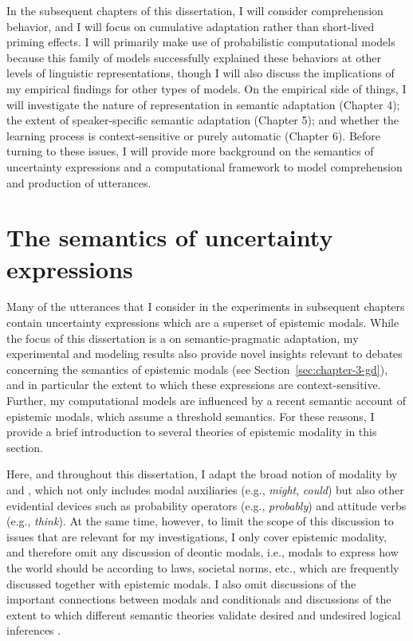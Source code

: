 In the subsequent chapters of this dissertation,  I will consider comprehension behavior, and I will focus on cumulative adaptation
rather than short-lived priming effects. I will primarily make use of probabilistic computational models because this family of models successfully explained these behaviors
at other levels of linguistic representations, though I will also discuss the implications
of my empirical findings for other types of models. On the empirical side of things, I will investigate the nature of representation in semantic adaptation (Chapter 4);
the extent of speaker-specific semantic adaptation (Chapter 5); and whether the learning process is context-sensitive or purely automatic (Chapter 6). Before turning to these
issues, I will provide more background on the semantics of uncertainty expressions and a computational framework to model comprehension and production of utterances.


\section{The semantics of uncertainty expressions}

Many of the utterances that I consider in the experiments in subsequent chapters contain uncertainty expressions which are a superset of epistemic modals.
While the focus of this dissertation is a on semantic-pragmatic adaptation, my experimental and modeling results also provide novel insights relevant to debates concerning
the semantics of epistemic modals (see Section~\ref{sec:chapter-3-gd}), and in particular the extent to which these expressions are context-sensitive.
Further, my computational models are influenced by a recent semantic account of epistemic modals, which
assume a threshold semantics. For these reasons, I provide a brief introduction to several theories of epistemic modality in this section. 

Here, and throughout this dissertation, I adapt the broad notion of modality by \textcite{Portner2009} and \textcite[][Ch.2]{Kratzer2012}, which not only 
includes modal auxiliaries (e.g., \textit{might}, \textit{could}) but also other evidential devices such as probability operators 
(e.g., \textit{probably}) and attitude verbs (e.g., \textit{think}). At the same time, however, to limit the scope of this discussion to issues that are relevant for my investigations,  
I only cover epistemic modality, and therefore omit any discussion of deontic modals, i.e., modals to express how the 
world should be according to laws, societal norms, etc., which are frequently discussed together with epistemic modals.
I also omit discussions of the important connections between modals and conditionals \parencite[see, e.g.,][]{Lewis1973,Kratzer1979,Kratzer2012}
and discussions of the extent to which different semantic theories validate desired and undesired logical inferences .

